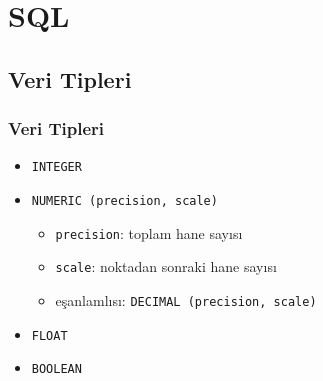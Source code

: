 \documentclass[dvipsnames]{beamer}
\theoremstyle{plain}
\begin{document}
%
%
%
%
\lstset{language=FullSQL}

\section{SQL}

\subsection{Veri Tipleri}

\begin{frame}
  \frametitle{Veri Tipleri}

  \begin{itemize}
    \item \texttt{INTEGER}

    \medskip
    \item \texttt{NUMERIC (precision, scale)}
    \begin{itemize}
      \item \texttt{precision}: toplam hane sayısı
      \item \texttt{scale}: noktadan sonraki hane sayısı
      \item eşanlamlısı: \texttt{DECIMAL (precision, scale)}
    \end{itemize}

    \medskip
    \item \texttt{FLOAT}

    \medskip
    \item \texttt{BOOLEAN}
  \end{itemize}
\end{frame}
\end{document}
